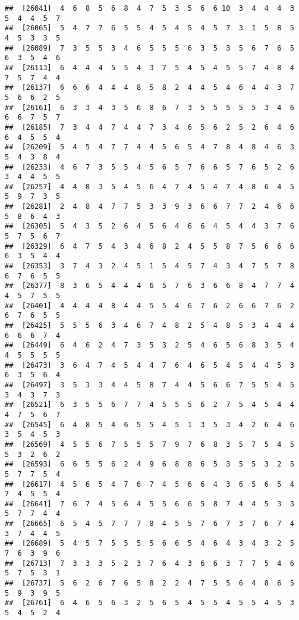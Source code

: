\documentclass[
]{book}
\begin{document}
\begin{verbatim}
##  [26041]  4  6  8  5  6  8  4  7  5  3  5  6  6 10  3  4  4  4  3  5  4  4  5  7
##  [26065]  5  4  7  7  6  5  5  4  5  4  5  4  5  7  3  1  5  8  5  4  5  3  3  5
##  [26089]  7  3  5  5  3  4  6  5  5  5  6  3  5  3  5  6  7  6  5  6  3  5  4  6
##  [26113]  6  4  4  4  5  5  4  3  7  5  4  5  4  5  5  7  4  8  4  7  5  7  4  4
##  [26137]  6  6  6  4  4  4  8  5  8  2  4  4  5  4  6  4  4  3  7  5  6  6  2  5
##  [26161]  6  3  3  4  3  5  6  8  6  7  3  5  5  5  5  5  3  4  6  6  6  7  5  7
##  [26185]  7  3  4  4  7  4  4  7  3  4  6  5  6  2  5  2  6  4  6  6  4  5  5  4
##  [26209]  5  4  5  4  7  7  4  4  5  6  5  4  7  8  4  8  4  6  3  5  4  3  8  4
##  [26233]  4  6  7  3  5  5  4  5  6  5  7  6  6  5  7  6  5  2  6  3  4  4  5  5
##  [26257]  4  4  8  3  5  4  5  6  4  7  4  5  4  7  4  8  6  4  5  5  9  7  3  5
##  [26281]  2  4  8  4  7  7  5  3  3  9  3  6  6  7  7  2  4  6  6  5  8  6  4  3
##  [26305]  5  4  3  5  2  6  4  5  6  4  6  6  4  5  4  4  3  7  6  5  7  5  6  7
##  [26329]  6  4  7  5  4  3  4  6  8  2  4  5  5  8  7  5  6  6  6  6  3  5  4  4
##  [26353]  3  7  4  3  2  4  5  1  5  4  5  7  4  3  4  7  5  7  8  6  7  6  5  5
##  [26377]  8  3  6  5  4  4  4  6  5  7  6  3  6  6  8  4  7  7  4  4  5  7  5  5
##  [26401]  4  4  4  4  8  4  4  5  5  4  6  7  6  2  6  6  7  6  2  6  7  6  5  5
##  [26425]  5  5  5  6  3  4  6  7  4  8  2  5  4  8  5  3  4  4  4  6  6  6  7  4
##  [26449]  6  4  6  2  4  7  3  5  3  2  5  4  6  5  6  8  3  5  4  4  5  5  5  5
##  [26473]  3  6  4  7  4  5  4  4  7  6  4  6  5  4  5  4  4  5  3  6  3  5  6  4
##  [26497]  3  5  3  3  4  4  5  8  7  4  4  5  6  6  7  5  5  4  5  3  4  3  7  3
##  [26521]  6  3  5  5  6  7  7  4  5  5  5  6  2  7  5  4  5  4  4  4  7  5  6  7
##  [26545]  6  4  8  5  4  6  5  5  4  5  1  3  5  3  4  2  6  4  6  3  5  4  5  3
##  [26569]  4  5  5  6  7  5  5  5  7  9  7  6  8  3  5  7  5  4  5  5  3  2  6  2
##  [26593]  6  6  5  5  6  2  4  9  6  8  8  6  5  3  5  5  3  2  5  5  7  7  5  4
##  [26617]  4  5  6  5  4  7  6  7  4  5  6  6  4  3  6  5  6  5  4  7  4  5  5  4
##  [26641]  7  6  7  4  5  6  4  5  5  6  6  5  8  7  4  4  5  3  3  5  7  7  4  4
##  [26665]  6  5  4  5  7  7  7  8  4  5  5  7  6  7  3  7  6  7  4  3  7  4  4  5
##  [26689]  5  4  5  7  5  5  5  5  6  6  5  4  6  4  3  4  3  2  5  7  6  3  9  6
##  [26713]  7  3  3  3  5  2  3  7  6  4  3  6  6  3  7  7  5  4  6  5  7  5  3  1
##  [26737]  5  6  2  6  7  6  5  8  2  2  4  7  5  5  6  4  8  6  5  5  9  3  9  5
##  [26761]  6  4  6  5  6  3  2  5  6  5  4  5  5  4  5  5  4  5  3  5  4  5  2  4

\end{verbatim}
\end{document}
